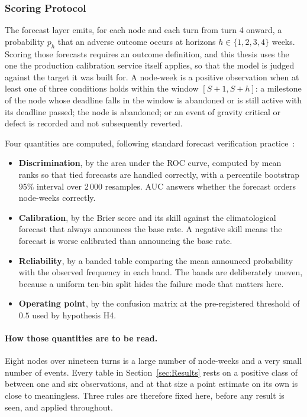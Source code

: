 \subsubsection{Scoring Protocol}
\label{sec:methods_scoring}

The forecast layer emits, for each node and each turn from turn 4 onward, a probability
$p_h$ that an adverse outcome occurs at horizons $h \in \{1,2,3,4\}$ weeks. Scoring those
forecasts requires an outcome definition, and this thesis uses the one the production
calibration service itself applies, so that the model is judged against the target it was
built for. A node-week is a positive observation when at least one of three conditions holds
within the window $[S+1, S+h]$: a milestone of the node whose deadline falls in the window
is abandoned or is still active with its deadline passed; the node is abandoned; or an event
of gravity critical or defect is recorded and not subsequently reverted.

Four quantities are computed, following standard forecast verification
practice~\autocite{brier1950verification,murphy1973vector,gneiting2007strictly}:

\begin{itemize}
    \item \textbf{Discrimination}, by the area under the ROC curve, computed by mean ranks
    so that tied forecasts are handled correctly, with a percentile bootstrap 95\% interval
    over 2\,000 resamples. AUC answers whether the forecast orders node-weeks correctly.
    \item \textbf{Calibration}, by the Brier score and its skill against the climatological
    forecast that always announces the base rate. A negative skill means the forecast is
    worse calibrated than announcing the base rate.
    \item \textbf{Reliability}, by a banded table comparing the mean announced probability
    with the observed frequency in each band. The bands are deliberately uneven, because a
    uniform ten-bin split hides the failure mode that matters here.
    \item \textbf{Operating point}, by the confusion matrix at the pre-registered threshold
    of $0.5$ used by hypothesis H4.
\end{itemize}

\paragraph{How those quantities are to be read.}
Eight nodes over nineteen turns is a large number of node-weeks and a very small number of
events. Every table in Section~\ref{sec:Results} rests on a positive class of between one and
six observations, and at that size a point estimate on its own is close to meaningless. Three
rules are therefore fixed here, before any result is seen, and applied throughout.

